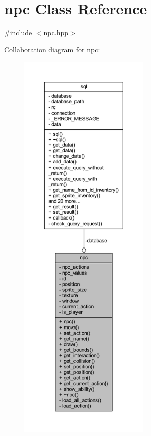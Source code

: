\hypertarget{classnpc}{}\section{npc Class Reference}
\label{classnpc}


{\ttfamily \#include $<$npc.\+hpp$>$}



Collaboration diagram for npc\+:
\nopagebreak
\begin{figure}[H]
\begin{center}
\leavevmode
\includegraphics[height=550pt]{classnpc__coll__graph}
\end{center}
\end{figure}
